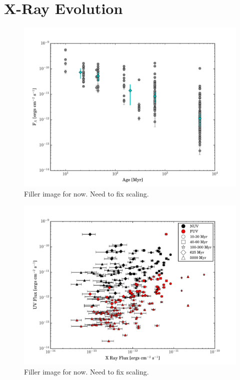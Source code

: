 \documentclass[twocolumn]{aastex62}
\begin{document}
\section{X-Ray Evolution}

\begin{figure}[h]
\includegraphics[width=\linewidth]{xray_evolution.pdf}
\caption{Filler image for now. Need to fix scaling. \label{fig:xray_evolution}}
\end{figure}

\begin{figure}[h]
\includegraphics[width=\linewidth]{uv_vs_xray_NO_J.pdf}
\caption{Filler image for now. Need to fix scaling. \label{fig:uv_vs_xray}}
\end{figure}
\end{document}
